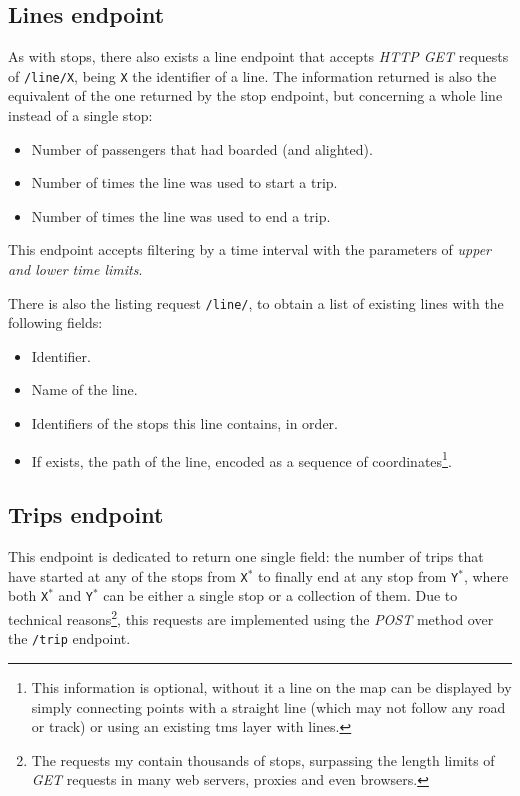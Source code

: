     \subsection{Lines endpoint}
    As with stops, there also exists a line endpoint that accepts {\em HTTP GET} requests of \texttt{/line/X}, being \texttt{X} the identifier of a line. The information returned is also the equivalent of the one returned by the stop endpoint, but concerning a whole line instead of a single stop:
    
    \begin{itemize}
        \item Number of passengers that had boarded (and alighted).
        \item Number of times the line was used to start a trip.
        \item Number of times the line was used to end a trip.
    \end{itemize}
    
    This endpoint accepts filtering by a time interval with the parameters of \textit{upper and lower time limits}.
    
    There is also the listing request \texttt{/line/}, to obtain a list of existing lines with the following fields:
    
    \begin{itemize}
        \item Identifier.
        \item Name of the line.
        \item Identifiers of the stops this line contains, in order.
        \item If exists, the path of the line, encoded as a sequence of coordinates\footnote{This information is optional, without it a line on the map can be displayed by simply connecting points with a straight line (which may not follow any road or track) or using an existing \gls{tms} layer with lines.}.
    \end{itemize}
    
    \subsection{Trips endpoint}
    This endpoint is dedicated to return one single field: the number of trips that have started at any of the stops from \texttt{X$^*$} to finally end at any stop from \texttt{Y$^*$}, where both \texttt{X$^*$} and \texttt{Y$^*$} can be either a single stop or a collection of them. Due to technical reasons\footnote{The requests my contain thousands of stops, surpassing the length limits of {\em GET} requests in many web servers, proxies and even browsers.}, this requests are implemented using the {\em POST} method over the \texttt{/trip} endpoint.
    
